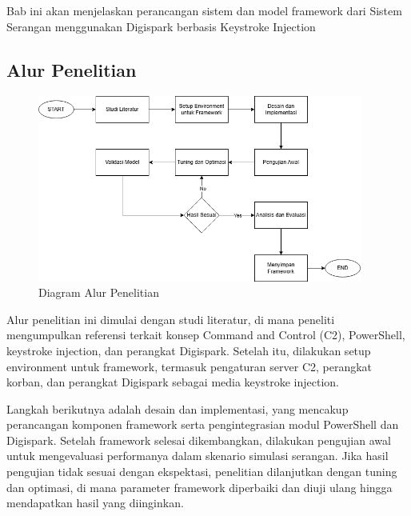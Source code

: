 \chapter{\babTiga}
Bab ini akan menjelaskan perancangan sistem dan model framework dari Sistem Serangan menggunakan Digispark berbasis Keystroke Injection


\section{Alur Penelitian}

\begin{figure}
	\centering
	\includegraphics[width=0.95\textwidth]
		{assets/pics/Alur Penelitian.png}
	\caption{Diagram Alur Penelitian}
	\label{fig:testGambar}
\end{figure}

Alur penelitian ini dimulai dengan studi literatur, di mana peneliti mengumpulkan referensi terkait konsep Command and Control (C2), PowerShell, keystroke injection, dan perangkat Digispark. Setelah itu, dilakukan setup environment untuk framework, termasuk pengaturan server C2, perangkat korban, dan perangkat Digispark sebagai media keystroke injection.


Langkah berikutnya adalah desain dan implementasi, yang mencakup perancangan komponen framework serta pengintegrasian modul PowerShell dan Digispark. Setelah framework selesai dikembangkan, dilakukan pengujian awal untuk mengevaluasi performanya dalam skenario simulasi serangan. Jika hasil pengujian tidak sesuai dengan ekspektasi, penelitian dilanjutkan dengan tuning dan optimasi, di mana parameter framework diperbaiki dan diuji ulang hingga mendapatkan hasil yang diinginkan.


